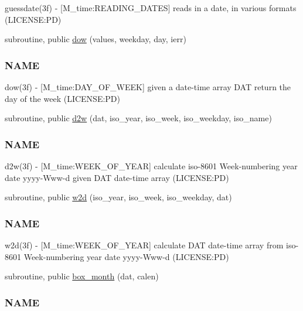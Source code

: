 \begin{DoxyCompactItemize}
\begin{DoxyCompactList}
guessdate(3f) -\/ \mbox{[}M\+\_\+time\+:R\+E\+A\+D\+I\+N\+G\+\_\+\+D\+A\+T\+ES\mbox{]} reads in a date, in various formats (L\+I\+C\+E\+N\+SE\+:PD) \end{DoxyCompactList}\item 
subroutine, public \mbox{\hyperlink{namespacem__time_adfda8a89820b8d0ad4581a14896e4ce5}{dow}} (values, weekday, day, ierr)
\begin{DoxyCompactList}\small\item\em \subsubsection*{N\+A\+ME}

dow(3f) -\/ \mbox{[}M\+\_\+time\+:D\+A\+Y\+\_\+\+O\+F\+\_\+\+W\+E\+EK\mbox{]} given a date-\/time array D\+AT return the day of the week (L\+I\+C\+E\+N\+SE\+:PD) \end{DoxyCompactList}\item 
subroutine, public \mbox{\hyperlink{namespacem__time_ad4ff99ad6f6d5282c4b65ad636a2a627}{d2w}} (dat, iso\+\_\+year, iso\+\_\+week, iso\+\_\+weekday, iso\+\_\+name)
\begin{DoxyCompactList}\small\item\em \subsubsection*{N\+A\+ME}

d2w(3f) -\/ \mbox{[}M\+\_\+time\+:W\+E\+E\+K\+\_\+\+O\+F\+\_\+\+Y\+E\+AR\mbox{]} calculate iso-\/8601 Week-\/numbering year date yyyy-\/\+Www-\/d given D\+AT date-\/time array (L\+I\+C\+E\+N\+SE\+:PD) \end{DoxyCompactList}\item 
subroutine, public \mbox{\hyperlink{namespacem__time_ac0ec48db8d508bfa23fe4b20c9d1c5a3}{w2d}} (iso\+\_\+year, iso\+\_\+week, iso\+\_\+weekday, dat)
\begin{DoxyCompactList}\small\item\em \subsubsection*{N\+A\+ME}

w2d(3f) -\/ \mbox{[}M\+\_\+time\+:W\+E\+E\+K\+\_\+\+O\+F\+\_\+\+Y\+E\+AR\mbox{]} calculate D\+AT date-\/time array from iso-\/8601 Week-\/numbering year date yyyy-\/\+Www-\/d (L\+I\+C\+E\+N\+SE\+:PD) \end{DoxyCompactList}\item 
subroutine, public \mbox{\hyperlink{namespacem__time_a0fe7540912df30d3578f3c469413aea8}{box\+\_\+month}} (dat, calen)
\begin{DoxyCompactList}\small\item\em \subsubsection*{N\+A\+ME}


\end{DoxyCompactList}
\end{DoxyCompactItemize}
